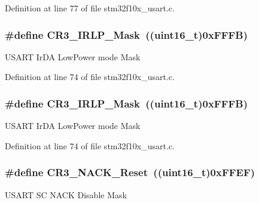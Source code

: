 Definition at line 77 of file stm32f10x\+\_\+usart.\+c.

\subsubsection[{\texorpdfstring{C\+R3\+\_\+\+I\+R\+L\+P\+\_\+\+Mask}{CR3_IRLP_Mask}}]{\setlength{\rightskip}{0pt plus 5cm}\#define C\+R3\+\_\+\+I\+R\+L\+P\+\_\+\+Mask~(({\bf uint16\+\_\+t})0x\+F\+F\+F\+B)}\hypertarget{group___u_s_a_r_t___private___defines_gaea5d8d002a34c3a587719533db2c17f9}{}\label{group___u_s_a_r_t___private___defines_gaea5d8d002a34c3a587719533db2c17f9}
U\+S\+A\+RT Ir\+DA Low\+Power mode Mask 

Definition at line 74 of file stm32f10x\+\_\+usart.\+c.

\subsubsection[{\texorpdfstring{C\+R3\+\_\+\+I\+R\+L\+P\+\_\+\+Mask}{CR3_IRLP_Mask}}]{\setlength{\rightskip}{0pt plus 5cm}\#define C\+R3\+\_\+\+I\+R\+L\+P\+\_\+\+Mask~(({\bf uint16\+\_\+t})0x\+F\+F\+F\+B)}\hypertarget{group___u_s_a_r_t___private___defines_gaea5d8d002a34c3a587719533db2c17f9}{}\label{group___u_s_a_r_t___private___defines_gaea5d8d002a34c3a587719533db2c17f9}
U\+S\+A\+RT Ir\+DA Low\+Power mode Mask 

Definition at line 74 of file stm32f10x\+\_\+usart.\+c.

\subsubsection[{\texorpdfstring{C\+R3\+\_\+\+N\+A\+C\+K\+\_\+\+Reset}{CR3_NACK_Reset}}]{\setlength{\rightskip}{0pt plus 5cm}\#define C\+R3\+\_\+\+N\+A\+C\+K\+\_\+\+Reset~(({\bf uint16\+\_\+t})0x\+F\+F\+E\+F)}\hypertarget{group___u_s_a_r_t___private___defines_gabed0cac273ff4faf009e8c35243c1e10}{}\label{group___u_s_a_r_t___private___defines_gabed0cac273ff4faf009e8c35243c1e10}
U\+S\+A\+RT SC N\+A\+CK Disable Mask 

